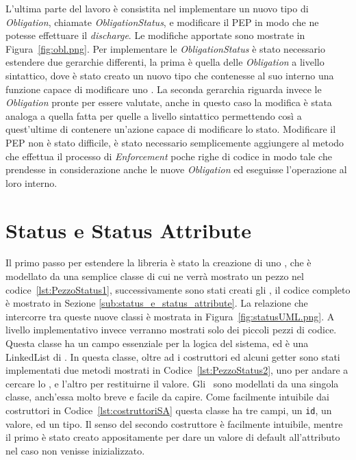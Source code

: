 L'ultima parte del lavoro è consistita nel implementare un nuovo tipo di \textit{Obligation}, chiamate \textit{ObligationStatus}, e modificare il PEP in modo che ne potesse effettuare il \textit{discharge}. Le modifiche apportate sono mostrate in Figura~\ref{fig:obl.png}. Per implementare le \textit{ObligationStatus} è stato necessario estendere due gerarchie differenti, la prima è quella delle \textit{Obligation} a livello sintattico, dove è stato creato un nuovo tipo che contenesse al suo interno una funzione capace di modificare uno \statusattribute. La seconda gerarchia riguarda invece le \textit{Obligation} pronte per essere valutate, anche in questo caso la modifica è stata analoga a quella fatta per quelle a livello sintattico permettendo così a quest'ultime di contenere un'azione capace di modificare lo stato. Modificare il PEP non è stato difficile, è stato necessario semplicemente aggiungere al metodo che effettua il processo di  \textit{Enforcement} poche righe di codice in modo tale che prendesse in considerazione anche le nuove \textit{Obligation} ed eseguisse l'operazione al loro interno.






\section{Status e Status Attribute} %
\label{sec:status_e_status_attribute}
Il primo passo per estendere la libreria è stato la creazione di uno \status, che è modellato da una semplice classe 
di cui ne verrà mostrato un pezzo nel codice~\ref{lst:PezzoStatus1}, successivamente sono stati creati gli \statusattribute, il codice completo è mostrato in Sezione \ref{sub:status_e_status_attribute}.
La relazione che intercorre tra queste nuove classi è mostrata in Figura~\ref{fig:statusUML.png}.
A livello implementativo invece verranno mostrati solo dei piccoli pezzi di codice.
Questa classe ha un campo essenziale per la logica del sistema, ed è una LinkedList di \statusattribute.
In questa classe, oltre ad i costruttori ed alcuni getter sono stati implementati due metodi mostrati in Codice~\ref{lst:PezzoStatus2}, uno per andare a cercare lo \statusattribute, e l'altro per restituirne il valore.
Gli \statusattribute \ sono modellati da una singola classe, anch'essa molto breve e facile da capire.
Come facilmente intuibile dai costruttori in Codice~\ref{lst:costruttoriSA} questa classe ha tre campi, un \texttt{id}, un valore, ed un tipo. 
Il senso del secondo costruttore è facilmente intuibile, mentre il primo è stato creato appositamente per dare un valore di default all'attributo nel caso non venisse inizializzato.

